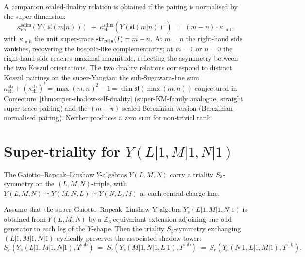 \begin{remark}
\label{rem:super-shadow-alternative-duality}
A companion scaled-duality relation is obtained if the pairing is
normalised by the super-dimension:
\[
\kappa_{\mathrm{ch}}^{\mathrm{sdim}}(Y(\mathfrak{sl}(m|n))) \;+\;
\kappa_{\mathrm{ch}}^{\mathrm{sdim}}(Y(\mathfrak{sl}(m|n))^!)
\;=\; (m - n) \cdot \kappa_{\mathrm{unit}},
\]
with $\kappa_{\mathrm{unit}}$ the unit super-trace $\mathrm{str}_{m|n}(I) =
m - n$. At $m = n$ the right-hand side vanishes, recovering the
bosonic-like complementarity; at $m = 0$ or $n = 0$ the right-hand
side reaches maximal magnitude, reflecting the asymmetry between the
two Koszul orientations. The two duality relations correspond
to distinct Koszul pairings on the super-Yangian: the
sub-Sugawara-line sum
$\kappa_{\mathrm{ch}}^{\mathrm{str}} +
(\kappa_{\mathrm{ch}}^{\mathrm{str}})^{!}
= \max(m, n)^2 - 1 = \dim \mathfrak{sl}(\max(m, n))$
conjectured in Conjecture~\ref{thm:super-shadow-self-duality}
(super-KM-family analogue, straight super-trace pairing) and the
$(m - n)$-scaled Berezinian version (Berezinian-normalised pairing).
Neither produces a zero sum for non-trivial rank.
\end{remark}

\section{Super-triality for \texorpdfstring{$Y(L|1, M|1, N|1)$}{Y(L|1, M|1, N|1)}}
\label{sec:super-riccati-gr-triality}

The Gaiotto--Rapcak--Linshaw $Y$-algebras $Y(L, M, N)$ carry a
triality $S_3$-symmetry on the $(L, M, N)$-triple, with $Y(L, M, N)
\simeq Y(M, N, L) \simeq Y(N, L, M)$ at each central-charge line.

\begin{proposition}
\label{thm:super-grl-triality-preserves-shadow}
Assume that the super-Gaiotto--Rapcak--Linshaw Y-algebra
$Y_s(L|1, M|1, N|1)$ is obtained from $Y(L,M,N)$ by a
$\mathbb{Z}_3$-equivariant extension adjoining one odd generator to
each leg of the $Y$-shape. Then the triality $S_3$-symmetry exchanging
$(L|1, M|1, N|1)$ cyclically preserves the associated shadow tower:
\[
S_r(Y_s(L|1, M|1, N|1), T^{\mathrm{sub}})
\;=\; S_r(Y_s(M|1, N|1, L|1), T^{\mathrm{sub}})
\;=\; S_r(Y_s(N|1, L|1, M|1), T^{\mathrm{sub}}).
\]
\end{proposition}

